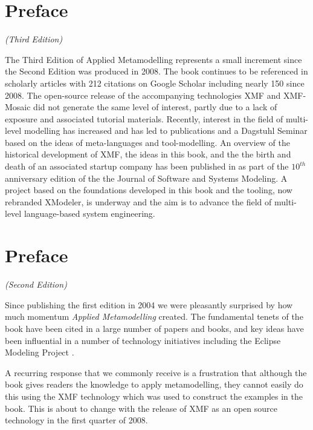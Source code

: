 \chapter*{Preface}
\LARGE{\emph{(Third Edition)}}\\[2cm]
\normalsize
{}

The Third Edition of Applied Metamodelling represents a small increment since the Second Edition was produced in 2008.
The book continues to be referenced in scholarly articles with 212 citations on Google Scholar including nearly 150 since 2008.
The open-source release of the accompanying technologies XMF and XMF-Mosaic did not generate the same level of
interest, partly due to a lack of exposure and associated tutorial materials. 
Recently, interest in the field of multi-level modelling has increased
and has led to publications \cite{clark2014foundation,clark2013ocl,clark2013domain,henderson2013search,clark2012software} and a Dagstuhl Seminar \cite{clark2013meta} based on the ideas of meta-languages and tool-modelling. An overview of the historical development of XMF, the ideas in this book, and the the birth and death of an associated startup company has been published in \cite{clark2012exploiting} as part of the $10^{th}$ anniversary edition of the the Journal of Software and Systems Modeling.
A project based on the foundations developed in this book and the tooling, now rebranded XModeler, is underway and the aim is to advance the field of multi-level language-based 
system engineering.


\chapter*{Preface}
\LARGE{\emph{(Second Edition)}}\\[2cm]
\normalsize
{}

Since publishing the first edition in 2004 we were pleasantly surprised by how much momentum
\emph{Applied Metamodelling} created.  The fundamental tenets of the book have been cited in a large
number of papers and books, and key ideas have been influential in a number of technology
initiatives including the Eclipse Modeling Project \cite{EMP}.

A recurring response that we
commonly receive is a frustration that although the book gives readers the knowledge to apply
metamodelling, they cannot easily do this using the XMF technology which was used to construct
the examples in the book.  This is about to change with the release of XMF as an open source
technology in the first quarter of 2008.

